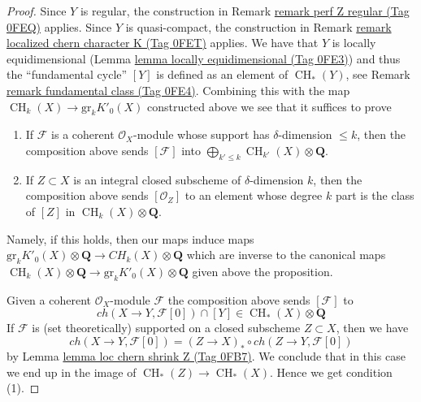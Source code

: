\documentclass{amsart}
\theoremstyle{plain}
\theoremstyle{definition}
\theoremstyle{remark}
\numberwithin{equation}{subsection}
\def\CH{\mathop{\mathrm{CH}}\nolimits}
\begin{document}
\begin{proof}
Since $Y$ is regular, the construction in
Remark \href{https://stacks.math.columbia.edu/tag/0FEQ}{remark perf Z regular (Tag 0FEQ)} applies.
Since $Y$ is quasi-compact, the construction in
Remark \href{https://stacks.math.columbia.edu/tag/0FET}{remark localized chern character K (Tag 0FET)} applies.
We have that $Y$ is locally equidimensional
(Lemma \href{https://stacks.math.columbia.edu/tag/0FE3}{lemma locally equidimensional (Tag 0FE3)}) and
thus the ``fundamental cycle'' $[Y]$ is defined
as an element of $\CH_*(Y)$, see Remark \href{https://stacks.math.columbia.edu/tag/0FE4}{remark fundamental class (Tag 0FE4)}.
Combining this with the map $\CH_k(X) \to \text{gr}_kK'_0(X)$
constructed above we see that it suffices to prove
\begin{enumerate}
\item If $\mathcal{F}$ is a coherent $\mathcal{O}_X$-module
whose support has $\delta$-dimension $\leq k$, then
the composition above sends $[\mathcal{F}]$ into
$\bigoplus_{k' \leq k} \CH_{k'}(X) \otimes \mathbf{Q}$.
\item If $Z \subset X$ is an integral closed subscheme
of $\delta$-dimension $k$, then the composition above
sends $[\mathcal{O}_Z]$ to an element whose degree $k$
part is the class of $[Z]$ in $\CH_k(X) \otimes \mathbf{Q}$.
\end{enumerate}
Namely, if this holds, then our maps induce maps
$\text{gr}_kK'_0(X) \otimes \mathbf{Q} \to CH_k(X) \otimes \mathbf{Q}$
which are inverse to the canonical maps 
$\CH_k(X) \otimes \mathbf{Q} \to \text{gr}_k K'_0(X) \otimes \mathbf{Q}$
given above the proposition.

\medskip\noindent
Given a coherent $\mathcal{O}_X$-module $\mathcal{F}$
the composition above sends $[\mathcal{F}]$ to
$$
ch(X \to Y, \mathcal{F}[0]) \cap [Y] \in \CH_*(X) \otimes \mathbf{Q}
$$
If $\mathcal{F}$ is (set theoretically) supported on a closed subscheme
$Z \subset X$, then we have
$$
ch(X \to Y, \mathcal{F}[0]) = (Z \to X)_* \circ ch(Z \to Y, \mathcal{F}[0])
$$
by Lemma \href{https://stacks.math.columbia.edu/tag/0FB7}{lemma loc chern shrink Z (Tag 0FB7)}. We conclude that in this
case we end up in the image of $\CH_*(Z) \to \CH_*(X)$. Hence
we get condition (1).


\end{proof}
\end{document}
